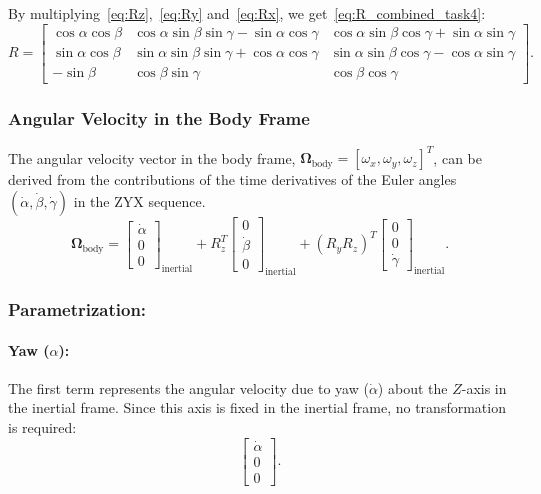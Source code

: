 \documentclass[12pt]{article}
\begin{document}
By multiplying~\ref{eq:Rz},~\ref{eq:Ry} and~\ref{eq:Rx}, we get~\ref{eq:R_combined_task4}:
\begin{equation}
\label{eq:R_full_task4}
R =
\begin{bmatrix}
\cos\alpha\cos\beta & \cos\alpha\sin\beta\sin\gamma - \sin\alpha\cos\gamma & \cos\alpha\sin\beta\cos\gamma + \sin\alpha\sin\gamma \\
\sin\alpha\cos\beta & \sin\alpha\sin\beta\sin\gamma + \cos\alpha\cos\gamma & \sin\alpha\sin\beta\cos\gamma - \cos\alpha\sin\gamma \\
-\sin\beta & \cos\beta\sin\gamma & \cos\beta\cos\gamma
\end{bmatrix}.
\end{equation}


\subsubsection{Angular Velocity in the Body Frame}

The angular velocity vector in the body frame, \(\boldsymbol{\Omega}_{\text{body}} = [\omega_x, \omega_y, \omega_z]^T\), can be derived from the contributions of the time derivatives of the Euler angles \((\dot{\alpha}, \dot{\beta}, \dot{\gamma})\) in the ZYX sequence.
\begin{equation}
\label{eq:omega_body_decomposition}
\boldsymbol{\Omega}_{\text{body}} =
\begin{bmatrix}
\dot{\alpha} \\
0 \\
0
\end{bmatrix}_{\text{inertial}}
+ R_z^T
\begin{bmatrix}
0 \\
\dot{\beta} \\
0
\end{bmatrix}_{\text{inertial}}
+ (R_y R_z)^T
\begin{bmatrix}
0 \\
0 \\
\dot{\gamma}
\end{bmatrix}_{\text{inertial}}.
\end{equation}

\subsubsection{Parametrization:}
\paragraph{Yaw (\(\alpha\)):}
The first term represents the angular velocity due to yaw (\(\dot{\alpha}\)) about the \(Z\)-axis in the inertial frame. Since this axis is fixed in the inertial frame, no transformation is required:
\begin{equation}
\label{eq:omega_yaw}
\begin{bmatrix}
\dot{\alpha} \\
0 \\
0
\end{bmatrix}.
\end{equation}
\end{document}

